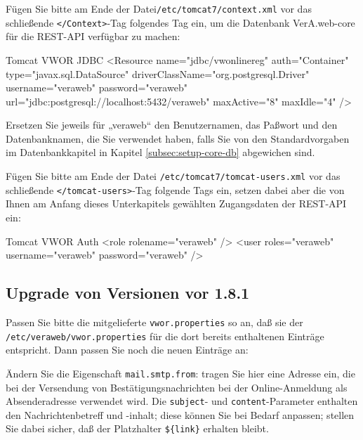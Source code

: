 \begin{minipage}{\textwidth}
Fügen Sie bitte am Ende der Datei\texttt{/etc/tomcat7/context.xml} vor
das schließende \texttt{</Context>}-Tag folgendes Tag ein, um die
 \ifupgradeanleitung
  Datenbank VerA.web-core
 \else%
 \fi%
für die REST-API verfügbar zu machen:

\begin{lstdump}[language=XML]{Tomcat VWOR JDBC}
<Resource name="jdbc/vwonlinereg" auth="Container" type="javax.sql.DataSource"
 driverClassName="org.postgresql.Driver" username="veraweb" password="veraweb"
 url="jdbc:postgresql://localhost:5432/veraweb" maxActive="8" maxIdle="4" />
\end{lstdump}

Ersetzen Sie jeweils für „veraweb“ den Benutzernamen, das Paßwort und den
Datenbanknamen, die Sie verwendet haben, falls Sie von den Standardvorgaben
 \ifupgradeanleitung
  im Datenbankkapitel
 \else%
  in Kapitel \ref{subsec:setup-core-db}
 \fi%
abgewichen sind.
\end{minipage}

\begin{minipage}{\textwidth}
Fügen Sie bitte am Ende der Datei \texttt{/etc/tomcat7/tomcat-users.xml} vor
das schließende \texttt{</tomcat-users>}-Tag folgende Tags ein, setzen dabei
aber die von Ihnen am Anfang dieses Unterkapitels gewählten Zugangsdaten der
REST-API ein:

\begin{lstdump}[language=XML]{Tomcat VWOR Auth}
<role rolename="veraweb" />
<user roles="veraweb" username="veraweb" password="veraweb" />
\end{lstdump}
\end{minipage}

\ifoa

\subsection{Upgrade von Versionen vor 1.8.1}\label{subsec:upgrade-181}

Passen Sie bitte die mitgelieferte \texttt{vwor.properties} so an,
daß sie der \texttt{/etc/veraweb/vwor.properties} für die
dort bereits enthaltenen Einträge entspricht. Dann passen Sie noch
die neuen Einträge an:

Ändern Sie die Eigenschaft \texttt{mail.smtp.from}: tragen Sie hier
eine Adresse ein, die bei der Versendung von Bestätigungsnachrichten
bei der Online-Anmeldung als Absenderadresse verwendet wird. Die
\texttt{subject}- und \texttt{content}-Parameter enthalten den
Nachrichtenbetreff und -inhalt; diese können Sie bei Bedarf anpassen;
stellen Sie dabei sicher, daß der Platzhalter \texttt{\$\{link\}}
erhalten bleibt.

